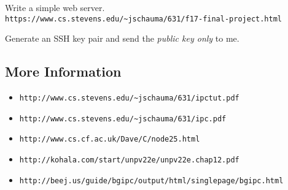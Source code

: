 \documentclass[xga]{xdvislides}
\begin{document}
Write a simple web server. \\
\verb+https://www.cs.stevens.edu/~jschauma/631/f17-final-project.html+

\vspace{.5in}
Generate an SSH key pair and send the {\em public key
only} to me.


\subsection{More Information}
\begin{itemize}
	\item \verb+http://www.cs.stevens.edu/~jschauma/631/ipctut.pdf+
	\item \verb+http://www.cs.stevens.edu/~jschauma/631/ipc.pdf+
	\item \verb+http://www.cs.cf.ac.uk/Dave/C/node25.html+
	\item \verb+http://kohala.com/start/unpv22e/unpv22e.chap12.pdf+
	\item \verb+http://beej.us/guide/bgipc/output/html/singlepage/bgipc.html+
\end{itemize}
\vspace{.5in}

\end{document}
